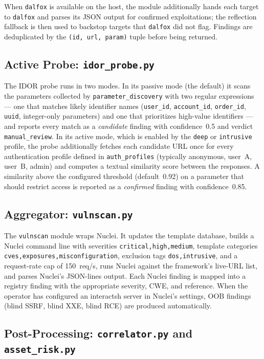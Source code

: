 When \texttt{dalfox} is available on the host, the module additionally hands each target to \texttt{dalfox} and parses its JSON output for confirmed exploitations; the reflection fallback is then used to backstop targets that \texttt{dalfox} did not flag. Findings are deduplicated by the \texttt{(id, url, param)} tuple before being returned.

\subsection{Active Probe: \texttt{idor\_probe.py}}

The IDOR probe runs in two modes. In its passive mode (the default) it scans the parameters collected by \texttt{parameter\_discovery} with two regular expressions --- one that matches likely identifier names (\texttt{user\_id}, \texttt{account\_id}, \texttt{order\_id}, \texttt{uuid}, integer-only parameters) and one that prioritizes high-value identifiers --- and reports every match as a \textit{candidate} finding with confidence~0.5 and verdict \texttt{manual\_review}. In its active mode, which is enabled by the \texttt{deep} or \texttt{intrusive} profile, the probe additionally fetches each candidate URL once for every authentication profile defined in \texttt{auth\_profiles} (typically anonymous, user~A, user~B, admin) and computes a textual similarity score between the responses. A similarity above the configured threshold (default~0.92) on a parameter that should restrict access is reported as a \textit{confirmed} finding with confidence~0.85.

\subsection{Aggregator: \texttt{vulnscan.py}}

The \texttt{vulnscan} module wraps Nuclei. It updates the template database, builds a Nuclei command line with severities \texttt{critical,high,medium}, template categories \texttt{cves,exposures,misconfiguration}, exclusion tags \texttt{dos,intrusive}, and a request-rate cap of 150~req/s, runs Nuclei against the framework's live-URL list, and parses Nuclei's JSON-lines output. Each Nuclei finding is mapped into a registry finding with the appropriate severity, CWE, and reference. When the operator has configured an interactsh server in Nuclei's settings, OOB findings (blind SSRF, blind XXE, blind RCE) are produced automatically.

\subsection{Post-Processing: \texttt{correlator.py} and \texttt{asset\_risk.py}}

